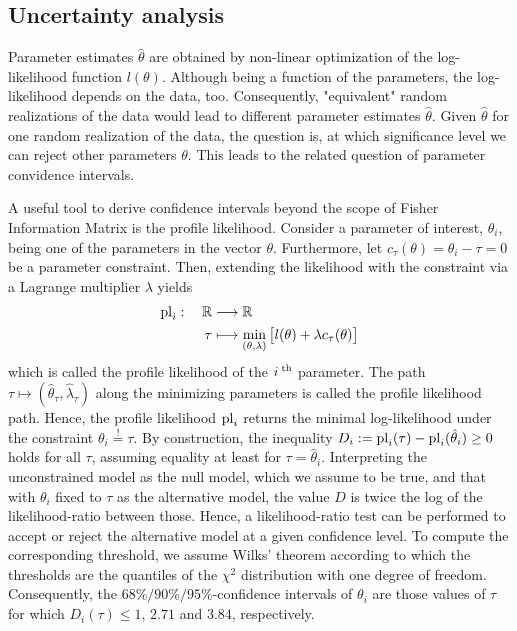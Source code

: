 \documentclass[article]{jss}
\begin{document}

\subsection{Uncertainty analysis}

Parameter estimates $\hat \theta$  are obtained by non-linear optimization of the log-likelihood function $l(\theta)$. Although being a function of the parameters,  the log-likelihood depends on the data, too. Consequently, "equivalent" random realizations of the data would lead to different parameter estimates $\hat\theta$. Given $\hat\theta$ for one random realization of the data, the question is, at which significance level we can reject other parameters $\theta$. This leads to the related question of parameter convidence intervals.

A useful tool to derive confidence intervals beyond the scope of Fisher Information Matrix is the profile likelihood. Consider a parameter of interest, $\theta_i$, being one of the parameters in the vector $\theta$. Furthermore, let $c_{\tau}(\theta) = \theta_i - \tau = 0$ be a parameter constraint.
Then, extending the likelihood with the constraint via a Lagrange multiplier $\lambda$ yields
\begin{align}
	\begin{aligned}
		{\rm pl}_i:\quad \mathbb R & \longrightarrow \mathbb R\\
		\tau & \longmapsto \min_{(\theta, \lambda)} \big[ l(\theta) + \lambda c_{\tau}(\theta) \big]
	\end{aligned}
	\label{eq:pl}
\end{align}
which is called the profile likelihood of the $i^{\;\rm th}$ parameter. The path $\tau \mapsto (\hat\theta_{\tau}, \hat\lambda_{\tau})$ along the minimizing parameters is called the profile likelihood path. Hence, the profile likelihood ${\rm pl}_i$ returns the minimal log-likelihood under the constraint $\theta_i \stackrel{!}{=} \tau$. By construction, the inequality $D_i := {\rm pl}_i(\tau) - {\rm pl}_i(\hat \theta_i) \geq 0$ holds for all $\tau$, assuming equality at least for $\tau = \hat\theta_i$. Interpreting the unconstrained model as the null model, which we assume to be true, and that with $\theta_i$ fixed to $\tau$ as the alternative model, the value $D$ is twice the log of the likelihood-ratio between those. Hence, a likelihood-ratio test can be performed to accept or reject the alternative model at a given confidence level. To compute the corresponding threshold, we assume Wilks' theorem according to which the thresholds are the quantiles of the $\chi^2$ distribution with one degree of freedom. Consequently, the $68\%/90\%/95\%$-confidence intervals of $\theta_i$ are those values of $\tau$ for which $D_i(\tau) \leq 1$, $2.71$ and $3.84$, respectively.
\end{document}
